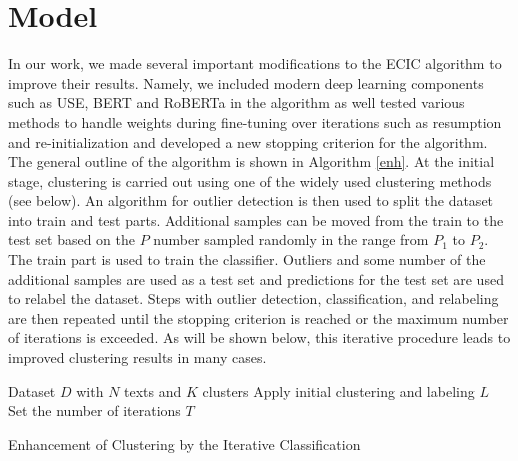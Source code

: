 \documentclass[11pt,a4paper]{article}
\begin{document}
\section{Model}
In our work, we made several important modifications to the ECIC algorithm\cite{rakib2020enhancement} to improve their results. Namely, we included modern deep learning components such as USE, BERT and RoBERTa in the algorithm as well tested various methods to handle weights during fine-tuning over iterations such as resumption and re-initialization and developed a new stopping criterion for the algorithm.  The general outline of the algorithm is shown in Algorithm \ref{enh}. At the initial stage, clustering is carried out using one of the widely used clustering methods (see below). An algorithm for outlier detection is then used to split the dataset into train and test parts. Additional samples can be moved from the train to the test set based on the $P$ number sampled randomly in the range from $P_1$ to $P_2$. The train part is used to train the classifier. Outliers and some number of the additional samples are used as a test set and predictions for the test set are used to relabel the dataset. Steps with outlier detection, classification, and relabeling are then repeated until the stopping criterion is reached or the maximum number of iterations is exceeded. As will be shown below, this iterative procedure leads to improved clustering results in many cases.

\begin{algorithm}
\label{enh}
\SetAlgoLined
{}
 Dataset $D$ with $N$ texts and $K$ clusters\;
 Apply initial clustering and labeling $L$\;
 Set the number of iterations $T$\;
\caption{Enhancement of Clustering by the Iterative Classification}
\end{algorithm}
\end{document}
